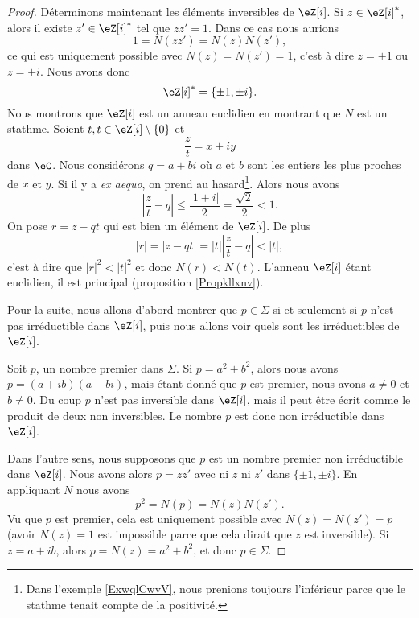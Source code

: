 \begin{proof}
    Déterminons maintenant les éléments inversibles de \( \eZ[i]\). Si \( z\in \eZ[i]^*\), alors il existe \( z'\in \eZ[i]^*\) tel que \( zz'=1\). Dans ce cas nous aurions
    \begin{equation}
        1=N(zz')=N(z)N(z'),
    \end{equation}
    ce qui est uniquement possible avec \( N(z)=N(z')=1\), c'est à dire \( z=\pm 1\) ou \( z=\pm i\). Nous avons donc
    \begin{equation}
        \eZ[i]^*=\{ \pm 1,\pm i \}.
    \end{equation}
    Nous montrons que \( \eZ[i]\) est un anneau euclidien en montrant que \( N\) est un stathme. Soient \( t,t\in \eZ[i]\setminus\{ 0 \}\) et 
    \begin{equation}
        \frac{ z }{ t }=x+iy
    \end{equation}
    dans \( \eC\). Nous considérons \( q=a+bi\) où \( a\) et \( b\) sont les entiers les plus proches de \( x\) et \( y\). Si il y a \emph{ex aequo}, on prend au hasard\footnote{Dans l'exemple \ref{ExwqlCwvV}, nous prenions toujours l'inférieur parce que le stathme tenait compte de la positivité.}. Alors nous avons
    \begin{equation}
        | \frac{ z }{ t }-q |\leq \frac{ | 1+i | }{ 2 }=\frac{ \sqrt{2} }{2}<1.
    \end{equation}
    On pose \( r=z-qt\) qui est bien un élément de \( \eZ[i]\). De plus
    \begin{equation}
        | r |=| z-qt |=| t | |\frac{ z }{ t }-q |<| t |,
    \end{equation}
    c'est à dire que \( | r |^2<| t |^2\) et donc \( N(r)<N(t)\). L'anneau \( \eZ[i]\) étant euclidien, il est principal (proposition \ref{Propkllxnv}).

    Pour la suite, nous allons d'abord montrer que \( p\in\Sigma\) si et seulement si \( p\) n'est pas irréductible dans \( \eZ[i]\), puis nous allons voir quels sont les irréductibles de \( \eZ[i]\).

    Soit \( p\), un nombre premier dans \( \Sigma\). Si \( p=a^2+b^2\), alors nous avons \( p=(a+ib)(a-bi)\), mais étant donné que \( p\) est premier, nous avons \( a\neq 0\) et \( b\neq 0\). Du coup \( p\) n'est pas inversible dans \( \eZ[i]\), mais il peut être écrit comme le produit de deux non inversibles. Le nombre \( p\) est donc non irréductible dans \( \eZ[i]\).

    Dans l'autre sens, nous supposons que \( p\) est un nombre premier non irréductible dans \( \eZ[i]\). Nous avons alors \( p=zz'\) avec ni \( z\) ni \( z'\) dans \( \{ \pm 1,\pm i \}\). En appliquant \( N\) nous avons
    \begin{equation}
        p^2=N(p)=N(z)N(z').
    \end{equation}
    Vu que \( p\) est premier, cela est uniquement possible avec \( N(z)=N(z')=p\) (avoir \( N(z)=1\) est impossible parce que cela dirait que \( z\) est inversible). Si \( z=a+ib\), alors \( p=N(z)=a^2+b^2\), et donc \( p\in \Sigma\).


\end{proof}
